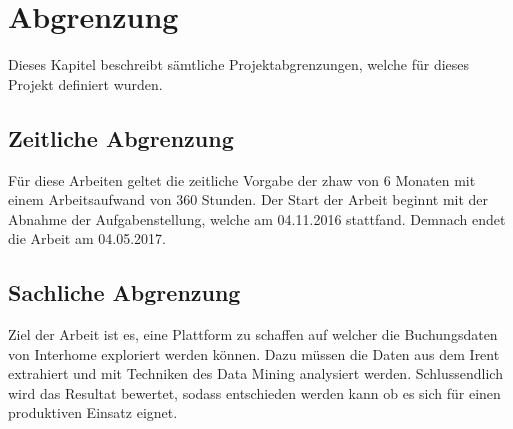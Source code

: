 %
	
					
					
					



\section{Abgrenzung}
\label{sec:einleitung:abgrenzung}
Dieses Kapitel beschreibt sämtliche Projektabgrenzungen, welche für dieses Projekt definiert
wurden.

\subsection{Zeitliche Abgrenzung}
Für diese Arbeiten geltet die zeitliche Vorgabe der \gls{zhaw} von 6 Monaten mit einem Arbeitsaufwand von 360 Stunden.
Der Start der Arbeit beginnt mit der Abnahme der Aufgabenstellung, welche am 04.11.2016 stattfand.
Demnach endet die Arbeit am 04.05.2017.

\subsection{Sachliche Abgrenzung}
Ziel der Arbeit ist es, eine Plattform zu schaffen auf welcher die Buchungsdaten von Interhome exploriert werden können. Dazu müssen die Daten aus dem Irent extrahiert und mit Techniken des Data Mining analysiert werden. Schlussendlich wird das Resultat bewertet, sodass entschieden werden kann ob es sich für einen produktiven Einsatz eignet.

